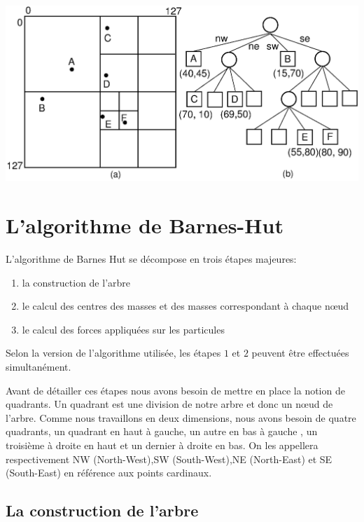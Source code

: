 \begin{center}
\includegraphics[scale=0.2]{./images/quadtree.png}
\captionsetup{hypcap=false}
\label{fig6}
\end{center}

\section{L'algorithme de Barnes-Hut}
L'algorithme de Barnes Hut se décompose en trois étapes majeures:

\begin{enumerate}
\item la construction de l'arbre

\item le calcul des centres des masses et des masses correspondant à chaque nœud

\item le calcul des forces appliquées sur les particules
\end{enumerate}

Selon la version de l'algorithme utilisée, les étapes $1$ et $2$ peuvent être effectuées simultanément. 

Avant de détailler ces étapes nous avons besoin de mettre en place la notion de quadrants. Un quadrant est une division de notre arbre et donc un nœud de l'arbre. Comme nous travaillons en deux dimensions, nous avons besoin de quatre quadrants, un quadrant en haut à gauche, un autre en bas à gauche , un troisième à droite en haut et un dernier à droite en bas. On les appellera respectivement NW (North-West),SW (South-West),NE (North-East) et SE (South-East) en référence aux points cardinaux.

\subsection{La construction de l'arbre}


